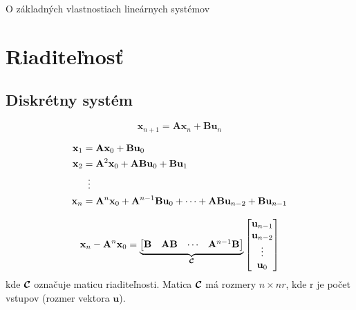 \documentclass[a4paper, 10pt, ]{article}
\begin{document}
\begin{flushleft}
    O základných vlastnostiach lineárnych systémov
\end{flushleft}

\bigskip

\normalsize
\normalfont



\section{Riaditeľnosť}


\subsection{Diskrétny systém}

\begin{equation}
    \label{Controllability.Discrete.Equation:StateSpaceModel}
    \bm{x}_{n + 1} = \bm{A} \bm{x}_{n} + \bm{B} \bm{u}_{n}
\end{equation}

\begin{subequations}
    \begin{align}
        \bm{x}_{1} &= \bm{A} \bm{x}_{0} + \bm{B} \bm{u}_{0} \\
        \bm{x}_{2} &= \bm{A}^2 \bm{x}_{0} + \bm{A} \bm{B} \bm{u}_{0} + \bm{B} \bm{u}_{1} \\
        &\vdotswithin{=} \nonumber \\
        \bm{x}_{n} &= \bm{A}^{n} \bm{x}_{0} + \bm{A}^{n - 1} \bm{B} \bm{u}_{0} + \cdots + \bm{A} \bm{B} \bm{u}_{n - 2} + \bm{B} \bm{u}_{n - 1}
    \end{align}
\end{subequations}

\begin{equation}
    \label{Controllability.Discrete.Equation:ControllabilityEquation}
    \mathbf{x}_{n} - \mathbf{A}^{n} \mathbf{x}_{0} = 
    \underbrace{
        \begin{bmatrix}
            \mathbf{B} & \mathbf{A} \mathbf{B} & \cdots & \mathbf{A}^{n - 1} \mathbf{B}
        \end{bmatrix}
    }_{\boldsymbol{\mathcal{C}}}
    \begin{bmatrix}
        \mathbf{u}_{n - 1} \\
        \mathbf{u}_{n - 2} \\
        \vdots         \\
        \mathbf{u}_{0}     \\
    \end{bmatrix}
\end{equation}
kde $\boldsymbol{\mathcal{C}}$ označuje maticu riaditeľnosti. Matica $\boldsymbol{\mathcal{C}}$ má rozmery $n \times nr$, kde r je počet vstupov (rozmer vektora $\bm{u}$). 
\end{document}
